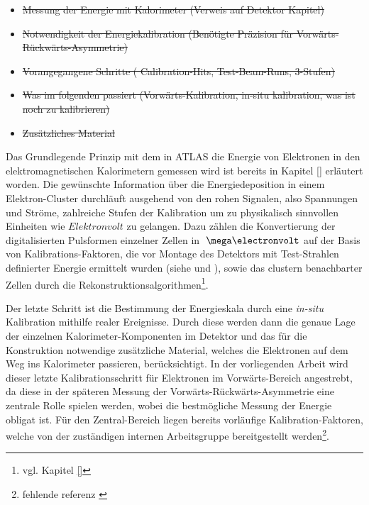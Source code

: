 \begin{itemize}
    \item \sout{Messung der Energie mit Kalorimeter (Verweis auf Detektor
        Kapitel)}
    \item \sout{Notwendigkeit der Energiekalibration (Benötigte Präzision für 
        Vorwärts-Rückwärts-Asymmetrie)}
    \item \sout{Vorangegangene Schritte ( Calibration-Hits, Test-Beam-Runs,
        3-Stufen)}
    \item \sout{Was im folgenden passiert (Vorwärts-Kalibration, in-situ
        kalibration, was ist noch zu kalibrieren)}
    \item \sout{Zusätzliches Material}
\end{itemize}

Das Grundlegende Prinzip mit dem in ATLAS die Energie von Elektronen in den
elektromagnetischen Kalorimetern gemessen wird ist bereits in Kapitel \ref{}
erläutert worden. Die gewünschte Information über die Energiedeposition in
einem Elektron-Cluster durchläuft ausgehend von den rohen Signalen, also
Spannungen und Ströme, zahlreiche Stufen der Kalibration um zu physikalisch
sinnvollen Einheiten wie $Elektronvolt$ zu gelangen. Dazu zählen die
Konvertierung der digitalisierten Pulsformen einzelner Zellen in $\MeV$ auf der
Basis von Kalibrations-Faktoren, die vor Montage des Detektors mit
Test-Strahlen definierter Energie ermittelt wurden (siehe \cite{Aleksa:942528}
und \cite{1748-0221-3-02-P02002}), sowie das clustern benachbarter Zellen durch
die Rekonstruktionsalgorithmen\footnote{vgl. Kapitel \ref{}}.

Der letzte Schritt ist die Bestimmung der Energieskala durch eine
\textit{in-situ} Kalibration mithilfe realer Ereignisse. Durch diese werden
dann die genaue Lage der einzelnen Kalorimeter-Komponenten im Detektor und das
für die Konstruktion notwendige zusätzliche Material, welches die Elektronen
auf dem Weg ins Kalorimeter passieren, berücksichtigt. In der vorliegenden
Arbeit wird dieser letzte Kalibrationsschritt für Elektronen im
Vorwärts-Bereich angestrebt, da diese in der späteren Messung der
Vorwärts-Rückwärts-Asymmetrie eine zentrale Rolle spielen werden, wobei die
bestmögliche Messung der Energie obligat ist. Für den Zentral-Bereich liegen
bereits vorläufige Kalibration-Faktoren, welche von der zuständigen internen
Arbeitsgruppe bereitgestellt werden\footnote{fehlende referenz \cite{}}.



%
